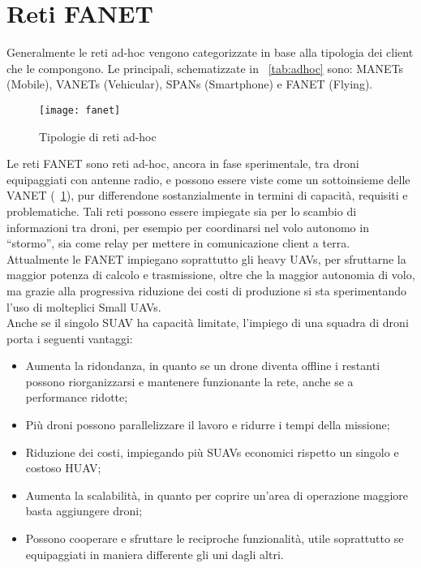 \section[Reti FANET]{Reti FANET}
Generalmente le reti ad-hoc vengono categorizzate in base alla tipologia dei client che le compongono. Le principali, schematizzate in \tablename\ \ref{tab:adhoc}  sono: MANETs (Mobile), VANETs (Vehicular), SPANs (Smartphone) e FANET (Flying). \\

\begin{figure}
	\begin{center}
		\texttt{[image: fanet]}
	\end{center}
	\caption{Tipologie di reti ad-hoc} \label{fig:fanet}
\end{figure}

Le reti FANET sono reti ad-hoc, ancora in fase sperimentale, tra droni equipaggiati con antenne radio, e possono essere viste come un sottoinsieme delle VANET (\figurename\ \ref{fig:fanet}), pur differendone sostanzialmente in termini di capacità, requisiti e problematiche. 
Tali reti possono essere impiegate sia per lo scambio di informazioni tra droni, per esempio per coordinarsi nel volo autonomo in “stormo”, sia come relay per mettere in comunicazione client a terra. \\
Attualmente le FANET impiegano soprattutto gli heavy UAVs, per sfruttarne la maggior potenza di calcolo e trasmissione, oltre che la maggior autonomia di volo, ma grazie alla progressiva riduzione dei costi di produzione si sta sperimentando l'uso di molteplici Small UAVs. \\
Anche se il singolo SUAV ha capacità limitate, l'impiego di una squadra di droni  porta i seguenti vantaggi:
\begin{itemize}
	\item Aumenta la ridondanza, in quanto se un drone diventa offline i restanti possono riorganizzarsi e mantenere funzionante la rete, anche se a performance ridotte;
	\item Più droni possono parallelizzare il lavoro e ridurre i tempi della missione;
	\item Riduzione dei costi, impiegando più SUAVs economici rispetto un singolo e costoso HUAV;
	\item Aumenta la scalabilità, in quanto per coprire un'area di operazione maggiore basta aggiungere droni;
	\item Possono cooperare e sfruttare le reciproche funzionalità, utile soprattutto se equipaggiati in maniera differente gli uni dagli altri.
\end{itemize}

